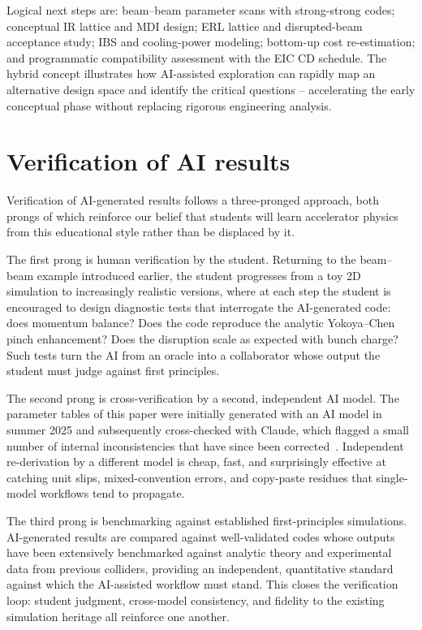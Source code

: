 \documentclass[%
               refpage,       %
               biblatex,     %
               hyphens,      %
               ]{jacow}
\begin{document}
Logical next steps are: beam--beam parameter scans with strong-strong 
codes; conceptual IR lattice and MDI design; ERL lattice and 
disrupted-beam acceptance study; IBS and cooling-power modeling; 
bottom-up cost re-estimation; and programmatic compatibility assessment 
with the EIC CD schedule. The hybrid concept illustrates how 
AI-assisted exploration can rapidly map an alternative design space 
and identify the critical questions -- accelerating the early 
conceptual phase without replacing rigorous engineering analysis.



\section{Verification of AI results}

Verification of AI-generated results follows a three-pronged approach, both prongs of which reinforce our belief that students will learn accelerator physics from this educational style rather than be displaced by it.

The first prong is human verification by the student. Returning to the beam--beam example introduced earlier, the student progresses from a toy 2D simulation to increasingly realistic versions, where at each step the student is encouraged to design diagnostic tests that interrogate the AI-generated code: does momentum balance? Does the code reproduce the analytic Yokoya--Chen pinch enhancement? Does the disruption scale as expected with bunch charge? Such tests turn the AI from an oracle into a collaborator whose output the student must judge against first principles. 

The second prong is cross-verification by a second, independent AI model. The parameter tables of this paper were initially generated with an AI model in summer 2025 and subsequently cross-checked with Claude, which flagged a small number of internal inconsistencies that have since been corrected~\cite{pars-verification}. Independent re-derivation by a different model is cheap, fast, and surprisingly effective at catching unit slips, mixed-convention errors, and copy-paste residues that single-model workflows tend to propagate.

The third prong is benchmarking against established first-principles simulations. AI-generated results are compared against well-validated codes whose outputs have been extensively benchmarked against analytic theory and experimental data from previous colliders, providing an independent, quantitative standard against which the AI-assisted workflow must stand. This closes the verification loop: student judgment, cross-model consistency, and fidelity to the existing simulation heritage all reinforce one another.
\end{document}
